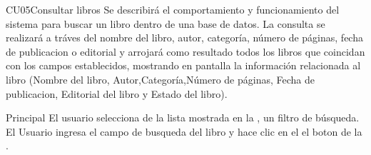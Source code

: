 
	\begin{UseCase}{CU05}{Consultar libros}{
		Se describirá el comportamiento y funcionamiento del sistema para buscar un libro dentro de una base de datos. La consulta se realizará a tráves del nombre del libro, autor, categoría, número de páginas, fecha de publicacion o editorial y arrojará como resultado todos los libros que coincidan con los campos establecidos, mostrando en pantalla la información relacionada al libro (Nombre del libro, Autor,Categoría,Número de páginas, Fecha de publicacion, Editorial del libro y Estado del libro).
	}
	\end{UseCase}
	\begin{UCtrayectoria}{Principal}
		\UCpaso[\UCactor] El usuario selecciona de la lista mostrada en la , un filtro de búsqueda.
		\UCpaso[\UCactor] El Usuario ingresa el campo de busqueda del libro y hace clic en el el boton  de la .
	\end{UCtrayectoria}

